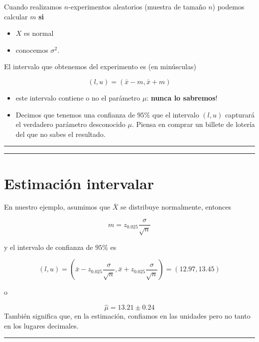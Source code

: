\documentclass[
]{book}
\providecommand{\tightlist}{%
  \setlength{\itemsep}{0pt}\setlength{\parskip}{0pt}}
\begin{document}
Cuando realizamos \(n\)-experimentos aleatorios (muestra de tamaño \(n\)) podemos calcular \(m\) \textbf{si}

\begin{itemize}
\tightlist
\item
  \(X\) es normal
\item
  conocemos \(\sigma^2\).
\end{itemize}

El intervalo que obtenemos del experimento es (en minúsculas)

\[(l,u)=(\bar{x} - m,\bar{x} + m)\]

\begin{itemize}
\item
  este intervalo contiene o no el parámetro \(\mu\): \textbf{nunca lo sabremos}!
\item
  Decimos que tenemos una confianza de \(95\%\) que el intervalo \((l,u)\) capturará el verdadero parámetro desconocido \(\mu\). Piensa en comprar un billete de lotería del que no sabes el resultado.
\end{itemize}

\begin{center}\rule{0.5\linewidth}{0.5pt}\end{center}

\begin{center}\rule{0.5\linewidth}{0.5pt}\end{center}

\hypertarget{estimaciuxf3n-intervalar-3}{%
\section{Estimación intervalar}\label{estimaciuxf3n-intervalar-3}}

En nuestro ejemplo, asumimos que \(\bar{X}\) se distribuye normalmente, entonces

\[m=z_{0.025} \frac{\sigma}{\sqrt{n}}\]

y el intervalo de confianza de \(95\%\) es

\[(l,u)=(\bar{x}-z_{0.025} \frac{\sigma}{\sqrt{n}}, \bar{x}+z_{0.025} \frac{\sigma}{ \sqrt{n}})= (12.97,13.45)\]

o

\[\hat{\mu}=13.21 \pm 0.24\]
También significa que, en la estimación, confiamos en las unidades pero no tanto en los lugares decimales.

\begin{center}\rule{0.5\linewidth}{0.5pt}\end{center}
\end{document}
